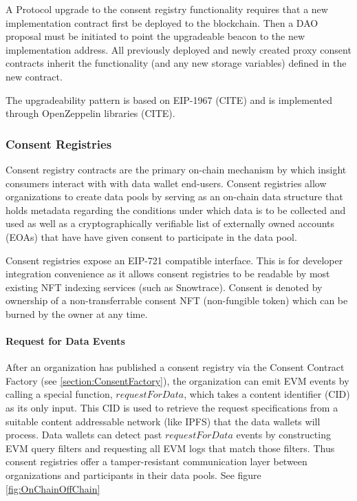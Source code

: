 A Protocol upgrade to the consent registry functionality requires that a new implementation contract first be deployed to the blockchain. Then a 
DAO proposal must be initiated to point the upgradeable beacon to the new implementation address. All previously deployed and newly created proxy 
consent contracts inherit the functionality (and any new storage variables) defined in the new contract.

The upgradeability pattern is based on EIP-1967 (CITE) and is implemented through OpenZeppelin libraries (CITE).

\subsubsection{Consent Registries}
\label{section:ConsentContract}


Consent registry contracts are the primary on-chain mechanism by which insight consumers interact with with data wallet end-users. Consent 
registries allow organizations to create data pools by serving as an on-chain data structure that holds metadata regarding the conditions 
under which data is to be collected and used as well as a cryptographically verifiable list of externally owned accounts (EOAs) that have
have given consent to participate in the data pool. 

Consent registries expose an EIP-721 compatible interface. This is for developer integration convenience as it allows consent registries to 
be readable by most existing NFT indexing services (such as Snowtrace). Consent is denoted by ownership of a non-transferrable consent NFT 
(non-fungible token) which can be burned by the owner at any time. 

\paragraph{Request for Data Events}

After an organization has published a consent registry via the Consent Contract Factory (see \ref{section:ConsentFactory}), the organization can emit
EVM events by calling a special function, $requestForData$, which takes a content identifier (CID) as its only input. This CID is used to 
retrieve the request specifications from a suitable content addressable network (like IPFS) that the data wallets will process. Data wallets can detect 
past $requestForData$ events by constructing EVM query filters and requesting all EVM logs that match those filters. Thus consent registries offer a 
tamper-resistant communication layer between organizations and participants in their data pools. See figure \ref{fig:OnChainOffChain}

